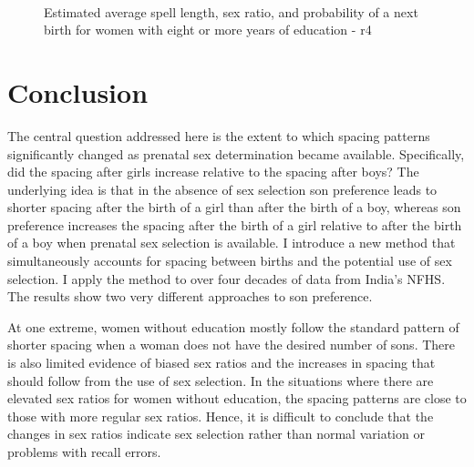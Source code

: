 \documentclass[12pt,letterpaper]{article}
\begin{document}
\begin{figure}[htpb]
\centering
{}
\\
\caption{Estimated average spell length, sex ratio, and probability of 
a next birth for women with eight or more years of education - r4}
\label{fig:bootstrap_high_r4}
\end{figure}



\section{Conclusion\label{sec:conclusion}}


The central question addressed here is the extent to which spacing patterns 
significantly changed as prenatal sex determination became available.
Specifically, did the spacing after girls increase relative to the spacing
after boys?
The underlying idea is that in the absence of sex selection son 
preference leads to shorter spacing after the birth of a girl than after the 
birth of a boy, whereas son preference increases the spacing after the birth 
of a girl relative to after the birth of a boy when prenatal sex selection is 
available.
I introduce a new method that simultaneously accounts for spacing
between births and the potential use of sex selection. 
I apply the method to over four decades of data from India's NFHS.
The results show two very different approaches to son preference.

At one extreme, women without education mostly follow the standard 
pattern of shorter spacing when a woman does not have the desired number of 
sons.
There is also limited evidence of biased sex ratios and the increases in
spacing that should follow from the use of sex selection.
 In the situations where there are elevated sex ratios for women without
education, the spacing patterns are close to those with more regular sex
ratios. 
Hence, it is difficult to conclude that the changes in sex
ratios indicate sex selection rather than normal variation or problems
with recall errors.
\end{document}
